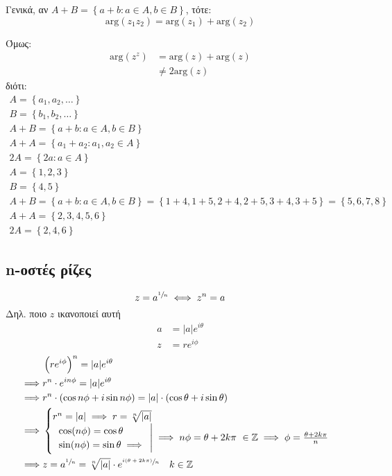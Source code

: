 \documentclass[12pt,a4paper,titlepage,fleqn]{article}
\begin{document}
    Γενικά, αν \( A+B = \left\lbrace a+b: a \in A, b \in B \right\rbrace \), τότε:
    \[
    \mathrm{arg}(z_1z_2) = \mathrm{arg}(z_1) + \mathrm{arg}(z_2)
    \]

    Όμως:
    \begin{align*}
    \mathrm{arg}(z^z) &= \mathrm{arg}(z)+\mathrm{arg}(z) \\
    &\neq 2\mathrm{arg}(z)
    \end{align*}
    διότι:
    \begin{gather*}
    	A = \left\lbrace a_1,a_2,\dots \right\rbrace \\
    	B = \left\lbrace b_1,b_2,\dots \right\rbrace \\
    	A+B = \left\lbrace a+b: a\in A, b\in B \right\rbrace \\
    	A+A = \left\lbrace a_1+a_2:a_1,a_2\in A \right\rbrace \\
    	2A = \left\lbrace 2a:a\in A \right\rbrace \\[.3pt]
    	A = \left\lbrace 1,2,3 \right\rbrace \\
    	B = \left\lbrace 4,5 \right\rbrace \\
    	A+B = \left\lbrace a+b:a\in A, b\in B \right\rbrace
    	= \left\lbrace 1+4,1+5,2+4,2+5,3+4,3+5 \right\rbrace
    	= \left\lbrace 5,6,7,8 \right\rbrace\\
    	A+A = \left\lbrace 2,3,4,5,6 \right\rbrace \\
    	2A = \left\lbrace 2,4,6 \right\rbrace
    \end{gather*}


   	\subsection{n-οστές ρίζες}
   	\[
   	z = a^{\sfrac{1}{n}} \iff z^n=a
   	\]
   	Δηλ. ποιο \( z \) ικανοποιεί αυτή
   	\begin{align*}
   	a &= |a|e^{i\theta} \\
   	z &= re^{i\phi}
   	\end{align*}
   	\begin{align*}
   	& \left( re^{i\phi} \right)^n = |a|e^{i\theta} \\
   	\implies& r^n\cdot e ^{in\phi} = |a|e^{i\theta} \\
   	\implies& r^n\cdot(\cos n\phi+i\sin n\phi) = |a|\cdot(\cos\theta+i\sin\theta)\\
   	\implies& \begin{cases}
   	r^n=|a|\implies r =\sqrt[n]{|a|} \\
   	\left.\begin{array}{l}
   	\cos(n\phi)=\cos\theta \\
   	\sin(n\phi)=\sin\theta \implies
   	\end{array}\right| \implies
   	n\phi = \theta+2k\pi \ \in\mathbb Z \implies \phi=\frac{\theta+2k\pi}{n}
   	\end{cases} \\
   	\implies& z=a^{\sfrac{1}{n}} = \sqrt[n]{|a|}\cdot
   	e^{\sfrac{i(\theta+2k\pi)}{n}} \quad k\in\mathbb Z
   	\end{align*}
\end{document}
